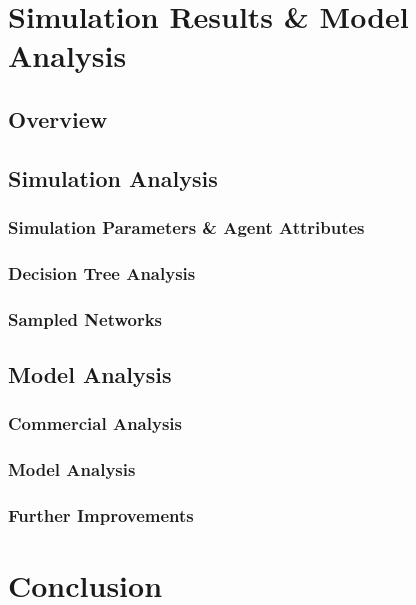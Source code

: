 \documentclass[]{report}
\begin{document}
\chapter{Simulation Results \& Model Analysis}
\section{Overview}
\section{Simulation Analysis}
\subsection{Simulation Parameters \& Agent Attributes}
\subsection{Decision Tree Analysis}
\subsection{Sampled Networks}
\section{Model Analysis}
\subsection{Commercial Analysis}
\subsection{Model Analysis}
\subsection{Further Improvements}
%
%

%
%
\chapter{Conclusion}
%
%


\end{document}
